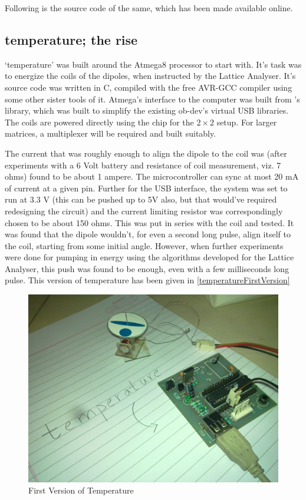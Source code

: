 		Following is the source code of the same, which has been made available online.
		
	\subsection{temperature; the rise}
		`temperature' was built around the Atmega8 processor to start with. It's task was to energize the coils of the dipoles, when instructed by the Lattice Analyser. It's source code was written in C, compiled with the free AVR-GCC compiler using some other sister tools of it. Atmega's interface to the computer was built from \myProf's library, which was built to simplify the existing ob-dev's virtual USB libraries. The coils are powered directly using the chip for the $2\times 2$ setup. For larger matrices, a multiplexer will be required and built suitably.
		\par
		The current that was roughly enough to align the dipole to the coil was (after experiments with a 6 Volt battery and resistance of coil measurement, viz. 7 ohms) found to be about 1 ampere. The microcontroller can sync at most 20 mA of current at a given pin. Further for the USB interface, the system was set to run at 3.3 V (this can be pushed up to 5V also, but that would've required redesigning the circuit) and the current limiting resistor was correspondingly chosen to be about 150 ohms. This was put in series with the coil and tested. It was found that the dipole wouldn't, for even a second long pulse, align itself to the coil, starting from some initial angle. However, when further experiments were done for pumping in energy using the algorithms developed for the Lattice Analyser, this push was found to be enough, even with a few milliseconds long pulse. This version of temperature has been given in \autoref{temperatureFirstVersion}
		\par
		\begin{figure}[bth]
			\begin{center}
				\includegraphics[width=0.85\linewidth]{gfx/temperature.jpg}
			\end{center}
		\caption[First Version of Temperature]{First Version of Temperature}
		\label{temperatureFirstVersion}
		\end{figure}
